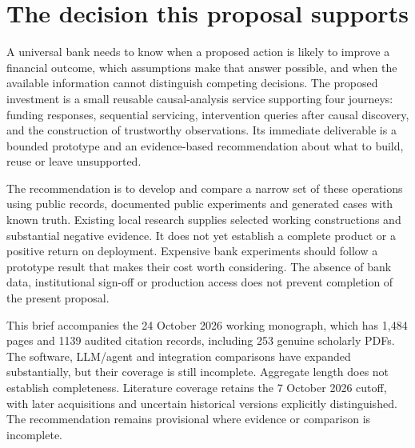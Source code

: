 \hypertarget{the-decision-this-proposal-supports}{%
\section{The decision this proposal
supports}\label{the-decision-this-proposal-supports}}

A universal bank needs to know when a proposed action is likely to
improve a financial outcome, which assumptions make that answer
possible, and when the available information cannot distinguish
competing decisions. The proposed investment is a small reusable
causal-analysis service supporting four journeys: funding responses,
sequential servicing, intervention queries after causal discovery, and
the construction of trustworthy observations. Its immediate deliverable
is a bounded prototype and an evidence-based recommendation about what
to build, reuse or leave unsupported.

The recommendation is to develop and compare a narrow set of these
operations using public records, documented public experiments and
generated cases with known truth. Existing local research supplies
selected working constructions and substantial negative evidence. It
does not yet establish a complete product or a positive return on
deployment. Expensive bank experiments should follow a prototype result
that makes their cost worth considering. The absence of bank data,
institutional sign-off or production access does not prevent completion
of the present proposal. \citep{sp13_scope}

This brief accompanies the 24 October 2026 working monograph, which has
1,484 pages and 1139 audited citation records, including 253 genuine
scholarly PDFs. The software, LLM/agent and integration comparisons have
expanded substantially, but their coverage is still incomplete.
Aggregate length does not establish completeness. Literature coverage
retains the 7 October 2026 cutoff, with later acquisitions and uncertain
historical versions explicitly distinguished. The recommendation remains
provisional where evidence or comparison is incomplete.
\citep{sp23nt_reader,sp23lt_reader,sp23dw_reader,sp23sm_reader,sp22wf_reader,sp22ft_reader,sp22si_reader,sp22ob_reader,sp22dk_reader,sp22iv_reader,sp22bs_reader,sp21rr_reader,sp21pr_reader,sp21gs_reader,sp21eo_reader,sp21tr_reader,sp21ae_reader,sp21gr_reader,sp21ck_reader,sp21cx_reader,sp20md_reader,sp20gf_reader,sp20hy_reader,sp20je_reader,sp20nc_reader,sp20gc_reader,sp20ea_reader,sp20vm_reader,sp20pye_reader,sp20fx_reader,sp20pa_reader,sp20rfx_reader}

